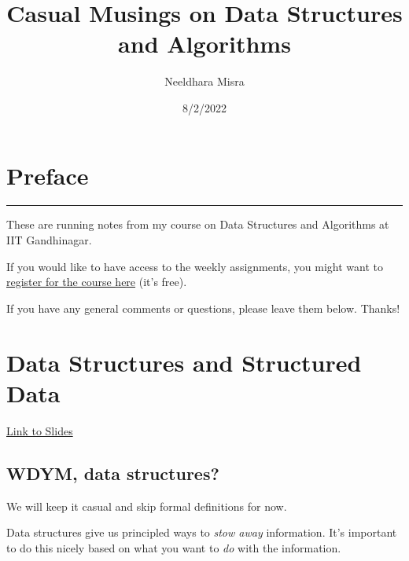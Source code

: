 \documentclass[
  letterpaper,
  DIV=11,
  numbers=noendperiod]{scrreprt}
\title{Casual Musings on Data Structures and Algorithms}
\author{Neeldhara Misra}
\date{8/2/2022}
\renewcommand*\contentsname{Table of contents}
\newcommand\contentsname{Table of contents}
\begin{document}
\maketitle
\ifdefined\Shaded\renewenvironment{Shaded}{\begin{tcolorbox}[interior hidden, breakable, enhanced, boxrule=0pt, frame hidden, sharp corners, borderline west={3pt}{0pt}{shadecolor}]}{\end{tcolorbox}}\fi

\renewcommand*\contentsname{Table of contents}
{
\hypersetup{linkcolor=}
\setcounter{tocdepth}{2}
\tableofcontents
}
\hypertarget{preface}{%
\chapter*{Preface}\label{preface}}

\begin{center}\rule{0.5\linewidth}{0.5pt}\end{center}

These are running notes from my course on Data Structures and Algorithms
at IIT Gandhinagar.

If you would like to have access to the weekly assignments, you might
want to \href{https://neeldhara.courses/}{register for the course here}
(it's free).

If you have any general comments or questions, please leave them below.
Thanks!

\hypertarget{hyvor-talk-view}{}

\hypertarget{data-structures-and-structured-data}{%
\chapter{Data Structures and Structured
Data}\label{data-structures-and-structured-data}}

\href{https://slides.com/neeldhara/dsa1-w01}{Link to Slides}

\hypertarget{wdym-data-structures}{%
\section{WDYM, data structures?}\label{wdym-data-structures}}

We will keep it casual and skip formal definitions for now. 👀

Data structures give us principled ways to \emph{stow away} information.
It's important to do this nicely based on what you want to \emph{do}
with the information.
\end{document}
